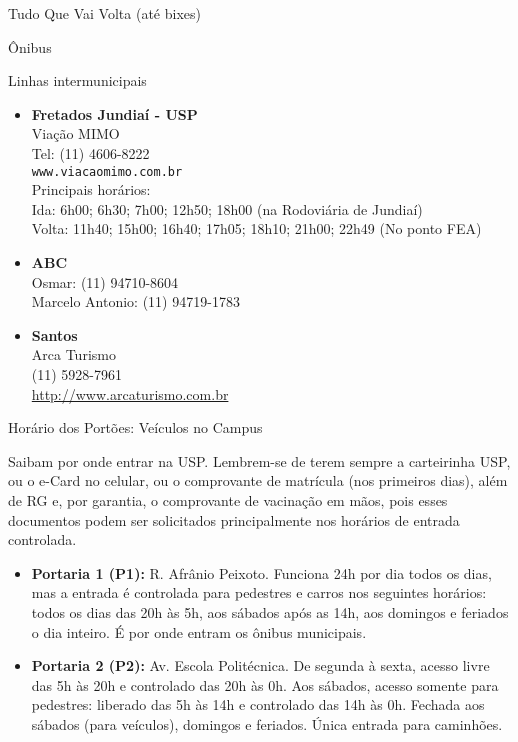 \begin{secao}{Tudo Que Vai Volta (até bixes)}
\begin{subsecao}{Ônibus}
\begin{subsubsecao}{Linhas intermunicipais}
\begin{itemize}
  \item {\bf Fretados Jundiaí - USP}\\
    Viação MIMO\\
    Tel: (11) 4606-8222\\
    {\tt www.viacaomimo.com.br}\\
    Principais horários:\\
    Ida: 6h00; 6h30; 7h00; 12h50; 18h00 (na Rodoviária de Jundiaí)\\
    Volta: 11h40; 15h00; 16h40; 17h05; 18h10; 21h00; 22h49 (No ponto FEA)

  \item {\bf ABC}\\
    Osmar: (11) 94710-8604\\
    Marcelo Antonio: (11) 94719-1783

  \item {\bf Santos}\\
    Arca Turismo\\
    (11) 5928-7961\\
    \url{http://www.arcaturismo.com.br}

\end{itemize}

\end{subsubsecao}

\end{subsecao}


\begin{subsecao}{Horário dos Portões: Veículos no Campus}

Saibam por onde entrar na USP. Lembrem-se de terem sempre a carteirinha USP, ou
o e-Card no celular, ou o comprovante de matrícula (nos primeiros dias), além de
RG e, por garantia, o comprovante de vacinação em mãos, pois esses documentos
podem ser solicitados principalmente nos horários de entrada controlada.
\begin{itemize}
  \item {\bf Portaria 1 (P1):} R. Afrânio Peixoto. Funciona 24h por dia todos os
  	dias, mas a entrada é controlada para pedestres e carros nos seguintes
	horários: todos os dias das 20h às 5h, aos sábados após as 14h, aos domingos
	e feriados o dia inteiro. É por onde entram os ônibus municipais.

  \item {\bf Portaria 2 (P2):} Av. Escola Politécnica. De segunda à sexta,
  	acesso livre das 5h às 20h e controlado das 20h às 0h. Aos sábados, acesso
	somente para pedestres: liberado das 5h às 14h e controlado das 14h às 0h.
	Fechada aos sábados (para veículos), domingos e feriados. Única entrada para
	caminhões.


\end{itemize}
\end{subsecao}
\end{secao}
